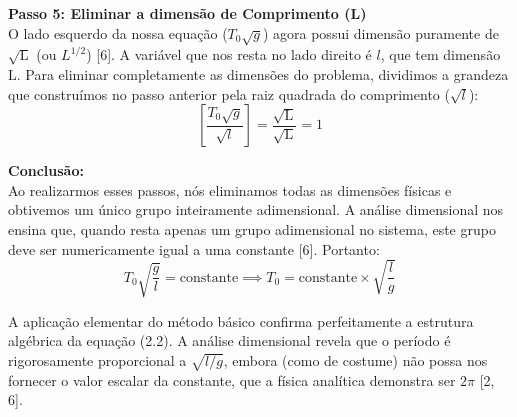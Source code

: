 \textbf{Passo 5: Eliminar a dimensão de Comprimento (L)} \\
O lado esquerdo da nossa equação ($T_0\sqrt{g}$) agora possui dimensão puramente de $\sqrt{\text{L}}$ (ou $L^{1/2}$) [6]. A variável que nos resta no lado direito é $l$, que tem dimensão $\text{L}$. Para eliminar completamente as dimensões do problema, dividimos a grandeza que construímos no passo anterior pela raiz quadrada do comprimento ($\sqrt{l}$):
$$ \left[ \frac{T_0\sqrt{g}}{\sqrt{l}} \right] = \frac{\sqrt{\text{L}}}{\sqrt{\text{L}}} = 1 $$

\vspace{0.3cm}
\textbf{Conclusão:} \\
Ao realizarmos esses passos, nós eliminamos todas as dimensões físicas e obtivemos um único grupo inteiramente adimensional. A análise dimensional nos ensina que, quando resta apenas um grupo adimensional no sistema, este grupo deve ser numericamente igual a uma constante [6]. Portanto:
$$ T_0 \sqrt{\frac{g}{l}} = \text{constante} \implies T_0 = \text{constante} \times \sqrt{\frac{l}{g}} $$

A aplicação elementar do método básico confirma perfeitamente a estrutura algébrica da equação (2.2). A análise dimensional revela que o período é rigorosamente proporcional a $\sqrt{l/g}$, embora (como de costume) não possa nos fornecer o valor escalar da constante, que a física analítica demonstra ser $2\pi$ [2, 6].